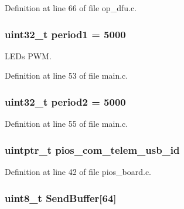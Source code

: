 \-Definition at line 66 of file op\-\_\-dfu.\-c.

\hypertarget{group___flying_f3_b_l_gabe751b3d399e053031c1e3db20b6b071}{
\subsubsection[{period1}]{\setlength{\rightskip}{0pt plus 5cm}uint32\-\_\-t {\bf period1} = 5000}}\label{group___flying_f3_b_l_gabe751b3d399e053031c1e3db20b6b071}


\-L\-E\-Ds \-P\-W\-M. 



\-Definition at line 53 of file main.\-c.

\hypertarget{group___flying_f3_b_l_gadf8633b43922fbf4f1d86981daf74ccc}{
\subsubsection[{period2}]{\setlength{\rightskip}{0pt plus 5cm}uint32\-\_\-t {\bf period2} = 5000}}\label{group___flying_f3_b_l_gadf8633b43922fbf4f1d86981daf74ccc}


\-Definition at line 55 of file main.\-c.

\hypertarget{group___flying_f3_b_l_ga513cc36d72b76de2fcb75ff233a79a4a}{
\subsubsection[{pios\-\_\-com\-\_\-telem\-\_\-usb\-\_\-id}]{\setlength{\rightskip}{0pt plus 5cm}uintptr\-\_\-t {\bf pios\-\_\-com\-\_\-telem\-\_\-usb\-\_\-id}}}\label{group___flying_f3_b_l_ga513cc36d72b76de2fcb75ff233a79a4a}


\-Definition at line 42 of file pios\-\_\-board.\-c.

\hypertarget{group___flying_f3_b_l_ga8f7836468d53f1bf54ab28474ae14624}{
\subsubsection[{\-Send\-Buffer}]{\setlength{\rightskip}{0pt plus 5cm}uint8\-\_\-t {\bf \-Send\-Buffer}\mbox{[}64\mbox{]}}}\label{group___flying_f3_b_l_ga8f7836468d53f1bf54ab28474ae14624}


